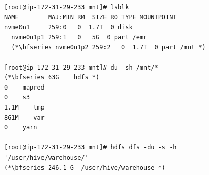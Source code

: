 \vspace{0.5cm}

\begin{lstlisting}[caption={Validation of HDFS use for EMR Presto.},label=listing:prestoHDFSvalidation,captionpos=b,frame=single]
[root@ip-172-31-29-233 mnt]# lsblk
NAME    	MAJ:MIN RM  SIZE RO TYPE MOUNTPOINT
nvme0n1 	259:0	0  1.7T  0 disk
  nvme0n1p1 259:1	0	5G  0 part /emr
  (*\bfseries nvme0n1p2 259:2	0  1.7T  0 part /mnt *)

[root@ip-172-31-29-233 mnt]# du -sh /mnt/*
(*\bfseries 63G    hdfs *)
0    mapred
0    s3
1.1M    tmp
861M    var
0    yarn

[root@ip-172-31-29-233 mnt]# hdfs dfs -du -s -h 
'/user/hive/warehouse/'
(*\bfseries 246.1 G  /user/hive/warehouse *)

\end{lstlisting}



